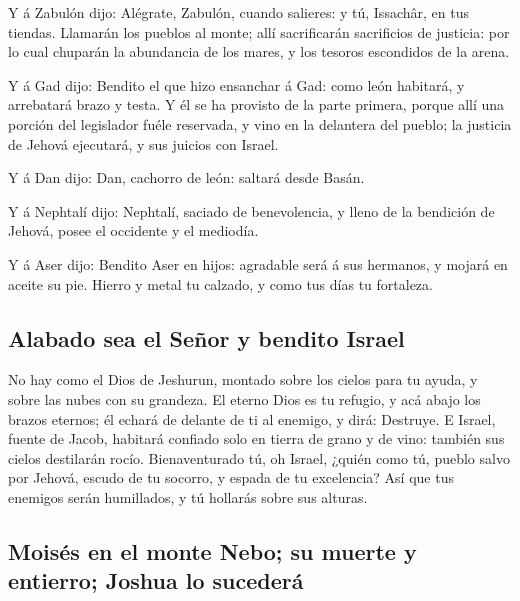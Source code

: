  Y á Zabulón dijo: Alégrate, Zabulón, cuando salieres: y
tú, Issachâr, en tus tiendas.  Llamarán los pueblos al
monte; allí sacrificarán sacrificios de justicia: por lo cual chuparán
la abundancia de los mares, y los tesoros escondidos de la arena.

 Y á Gad dijo: Bendito el que hizo ensanchar á Gad: como
león habitará, y arrebatará brazo y testa.  Y él se ha
provisto de la parte primera, porque allí una porción del legislador
fuéle reservada, y vino en la delantera del pueblo; la justicia de
Jehová ejecutará, y sus juicios con Israel.

 Y á Dan dijo: Dan, cachorro de león: saltará desde
Basán.

 Y á Nephtalí dijo: Nephtalí, saciado de benevolencia, y
lleno de la bendición de Jehová, posee el occidente y el mediodía.

 Y á Aser dijo: Bendito Aser en hijos: agradable será á
sus hermanos, y mojará en aceite su pie.  Hierro y metal
tu calzado, y como tus días tu fortaleza.

\hypertarget{alabado-sea-el-seuxf1or-y-bendito-israel}{%
\subsection{Alabado sea el Señor y bendito
Israel}\label{alabado-sea-el-seuxf1or-y-bendito-israel}}

 No hay como el Dios de Jeshurun, montado sobre los
cielos para tu ayuda, y sobre las nubes con su grandeza. 
El eterno Dios es tu refugio, y acá abajo los brazos eternos; él echará
de delante de ti al enemigo, y dirá: Destruye.  E Israel,
fuente de Jacob, habitará confiado solo en tierra de grano y de vino:
también sus cielos destilarán rocío.  Bienaventurado tú,
oh Israel, ¿quién como tú, pueblo salvo por Jehová, escudo de tu
socorro, y espada de tu excelencia? Así que tus enemigos serán
humillados, y tú hollarás sobre sus alturas.

\hypertarget{moisuxe9s-en-el-monte-nebo-su-muerte-y-entierro-joshua-lo-sucederuxe1}{%
\subsection{Moisés en el monte Nebo; su muerte y entierro; Joshua lo
sucederá}\label{moisuxe9s-en-el-monte-nebo-su-muerte-y-entierro-joshua-lo-sucederuxe1}}

